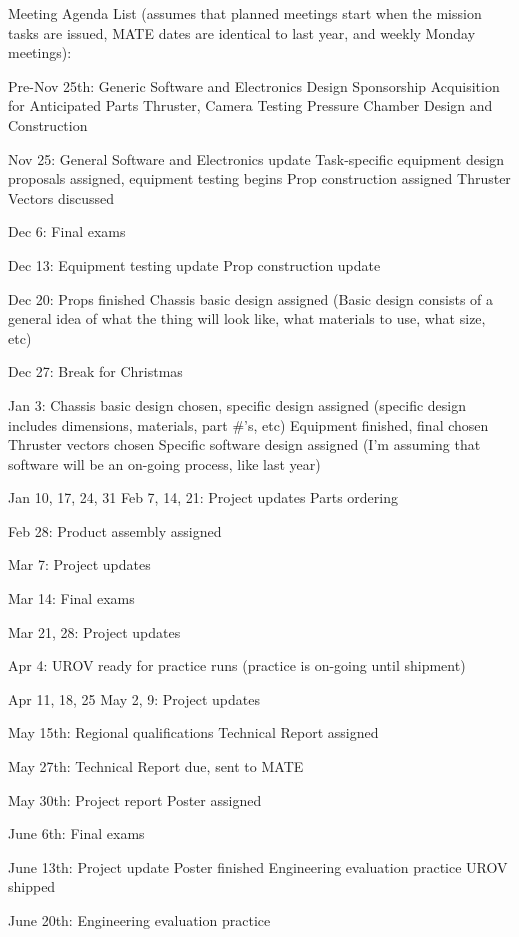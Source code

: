 \documentclass{proposalnsf}
\begin{document}
Meeting Agenda List (assumes that planned meetings start when the
mission tasks are issued, MATE dates are identical to last year, and
weekly Monday meetings):

Pre-Nov 25th:
     Generic Software and Electronics Design
     Sponsorship Acquisition for Anticipated Parts
     Thruster, Camera Testing
     Pressure Chamber Design and Construction

Nov 25:
     General Software and Electronics update
     Task-specific equipment design proposals assigned, equipment
testing begins
     Prop construction assigned
     Thruster Vectors discussed

Dec 6: Final exams

Dec 13:
     Equipment testing update
     Prop construction update

Dec 20:
     Props finished
     Chassis basic design assigned (Basic design consists of a general
idea of what the thing will look like, what materials to use, what
size, etc)

Dec 27:   Break for Christmas

Jan 3:
     Chassis basic design chosen, specific design assigned (specific
design includes dimensions, materials, part #'s, etc)
     Equipment finished, final chosen
     Thruster vectors chosen
     Specific software design assigned (I'm assuming that software
will be an on-going process, like last year)

Jan 10, 17, 24, 31
Feb 7, 14, 21:
     Project updates
     Parts ordering

Feb 28:
     Product assembly assigned

Mar 7:
     Project updates

Mar 14: Final exams

Mar 21, 28:
     Project updates

Apr 4: UROV ready for practice runs (practice is on-going until
shipment)

Apr 11, 18, 25
May 2, 9:
     Project updates

May 15th:
     Regional qualifications
     Technical Report assigned

May 27th:
     Technical Report due, sent to MATE

May 30th:
     Project report
     Poster assigned

June 6th: Final exams

June 13th:
     Project update
     Poster finished
     Engineering evaluation practice
     UROV shipped

June 20th:
     Engineering evaluation practice
\end{document}
